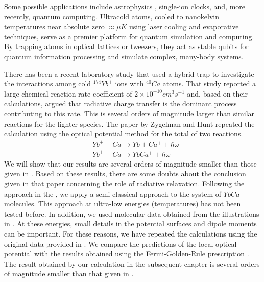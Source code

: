 Some possible applications include astrophysics \cite{Zygelman1}, single-ion clocks, and, more recently, quantum computing.  Ultracold atoms, cooled to nanokelvin temperatures near absolute zero $ \approx \mu K $  using laser cooling and evaporative techniques, serve as a premier platform for quantum simulation and computing. By trapping atoms in optical lattices or tweezers, they act as stable qubits for quantum information processing and simulate complex, many-body systems. 

There has been a recent \cite{C1CP21205B} laboratory study that used a hybrid trap to investigate the interactions among cold $ {^{174}}Yb^+ $ ions with $ {}^{40}Ca $ atoms. That study reported a large chemical reaction rate coefficient of $ 2\times 10^{-10} cm^3 s^ {-1}$ and, based on their calculations, argued that radiative charge transfer is the dominant process contributing to this rate. This is several orders of magnitude larger than similar reactions for the lighter species. The paper by Zygelman and Hunt \cite{ZygelmanHunt2012} repeated the calculation using the optical potential method \cite{Zygelman88} for the total of two reactions.
\begin{equation}\label{Eq1}
\begin{split}
  & Yb^+ + Ca \rightarrow Yb + Ca^+ + \hbar\omega \\[.8em]
  & Yb^+ + Ca \rightarrow YbCa^+ + \hbar\omega 
\end{split}
\end{equation}
We will show that our results are several orders of magnitude smaller than those given in \cite{C1CP21205B}. Based on these results, there are some doubts about the conclusion given in that paper concerning the role of radiative relaxation.  Following the approach in the \cite{ZL}, we apply a semi-classical approach to the system of $ YbCa $ molecules. This approach at ultra-low energies (temperatures) has not been tested before. 
In addition, we used molecular data obtained from the illustrations in \cite{C1CP21205B}. At these energies, small details in the potential surfaces and dipole moments can be important. For these reasons, we have repeated the calculations using the original data provided in \cite{C1CP21205B}. We compare the predictions of the local-optical potential with the results obtained using the Fermi-Golden-Rule prescription \cite{Zygelman88}.
The result obtained by our calculation in the subsequent chapter is several orders of magnitude smaller than that given in \cite{C1CP21205B}. 

